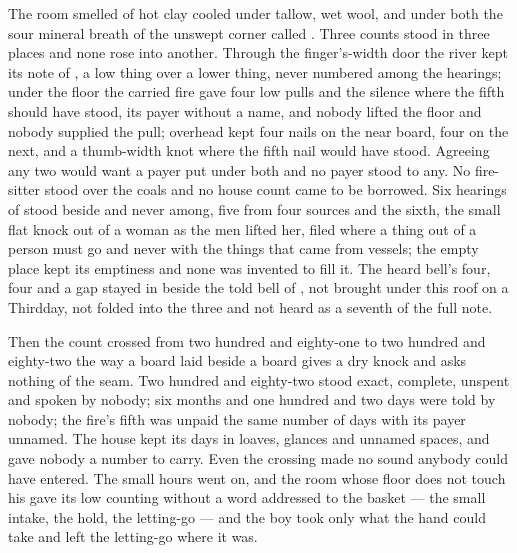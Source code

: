 The room smelled of hot clay cooled under tallow, wet wool, and under both the sour mineral breath of the unswept corner called . Three counts stood in three places and none rose into another. Through the finger's-width door the river kept its note of , a low thing over a lower thing, never numbered among the hearings; under the floor the carried fire gave four low pulls and the silence where the fifth should have stood, its payer without a name, and nobody lifted the floor and nobody supplied the pull; overhead  kept four nails on the near board, four on the next, and a thumb-width knot where the fifth nail would have stood. Agreeing any two would want a payer put under both and no payer stood to any. No fire-sitter stood over the coals and no house count came to be borrowed. Six hearings of  stood beside and never among, five from four sources and the sixth, the small flat knock out of a woman as the men lifted her, filed where a thing out of a person must go and never with the things that came from vessels; the empty place kept its emptiness and none was invented to fill it. The heard bell's four, four and a gap stayed in  beside the told bell of , not brought under this roof on a Thirdday, not folded into the three and not heard as a seventh of the full note.

Then the count crossed from two hundred and eighty-one to two hundred and eighty-two the way a board laid beside a board gives a dry knock and asks nothing of the seam. Two hundred and eighty-two stood exact, complete, unspent and spoken by nobody; six months and one hundred and two days were told by nobody; the fire's fifth was unpaid the same number of days with its payer unnamed. The house kept its days in loaves, glances and unnamed spaces, and gave nobody a number to carry. Even the crossing made no sound anybody could have entered. The small hours went on, and the room whose floor does not touch his gave its low counting without a word addressed to the basket --- the small intake, the hold, the letting-go --- and the boy took only what the hand could take and left the letting-go where it was.

